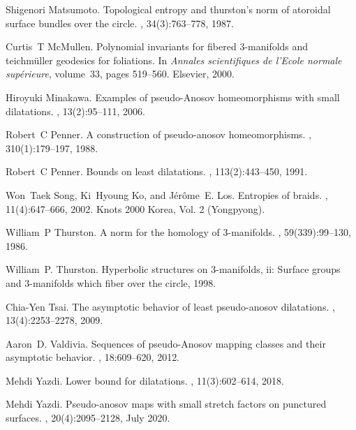 \documentclass[microtype]{gtpart}     %
\theoremstyle{definition}
\theoremstyle{definition}
\theoremstyle{definition}
\theoremstyle{remark}
\theoremstyle{definition}
\begin{document}
\begin{thebibliography}{10}
Shigenori Matsumoto.
\newblock Topological entropy and thurston’s norm of atoroidal surface
  bundles over the circle.
, 34(3):763--778, 1987.

Curtis~T McMullen.
\newblock Polynomial invariants for fibered 3-manifolds and teichm{\"u}ller
  geodesics for foliations.
\newblock In {\em Annales scientifiques de l’Ecole normale sup{\'e}rieure},
  volume~33, pages 519--560. Elsevier, 2000.

Hiroyuki Minakawa.
\newblock Examples of pseudo-{A}nosov homeomorphisms with small dilatations.
, 13(2):95--111, 2006.

Robert~C Penner.
\newblock A construction of pseudo-anosov homeomorphisms.
,
  310(1):179--197, 1988.

Robert~C Penner.
\newblock Bounds on least dilatations.
,
  113(2):443--450, 1991.

Won~Taek Song, Ki~Hyoung Ko, and J\'{e}r\^{o}me~E. Los.
\newblock Entropies of braids.
, 11(4):647--666, 2002.
\newblock Knots 2000 Korea, Vol. 2 (Yongpyong).

William~P Thurston.
\newblock A norm for the homology of 3-manifolds.
, 59(339):99--130,
  1986.

William~P. Thurston.
\newblock Hyperbolic structures on 3-manifolds, ii: Surface groups and
  3-manifolds which fiber over the circle, 1998.

Chia-Yen Tsai.
\newblock The asymptotic behavior of least pseudo-anosov dilatations.
, 13(4):2253--2278, 2009.

Aaron~D. Valdivia.
\newblock Sequences of pseudo-{A}nosov mapping classes and their asymptotic
  behavior.
, 18:609--620, 2012.

Mehdi Yazdi.
\newblock Lower bound for dilatations.
, 11(3):602--614, 2018.

Mehdi Yazdi.
\newblock Pseudo-anosov maps with small stretch factors on punctured surfaces.
, 20(4):2095--2128, July 2020.

\end{thebibliography}
\end{document}
